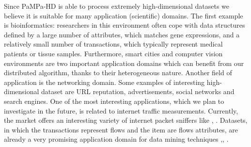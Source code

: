 Since PaMPa-HD is able to process extremely high-dimensional datasets we believe it is suitable for 
many application (scientific) domains. 
The first example is bioinformatics: 
researchers in this environment often cope with data structures 
defined by a large number of attributes, 
which matches gene expressions, 
and a relatively small number of transactions, 
which typically represent medical patients or tissue samples. 
Furthermore, smart cities and computer vision environments 
are two important application domains which can benefit 
from our distributed algorithm,
thanks to their heterogeneous nature.
Another field of application is the networking domain. 
Some examples of interesting high-dimensional dataset are 
URL reputation, advertisements, social networks and search engines. 
One of the most interesting applications, 
which we plan to investigate in the future,
is related to internet traffic measurements. 
Currently, the market offers an interesting variety of internet packet sniffers like \cite{Tstat}, \cite{netflow}. 
Datasets, in which the transactions represent flows and the item are flows attributes, 
are already a very promising application domain 
for data mining techniques \cite{trustcom2013},\cite{fontas_AR}, \cite{Netmine}. 
